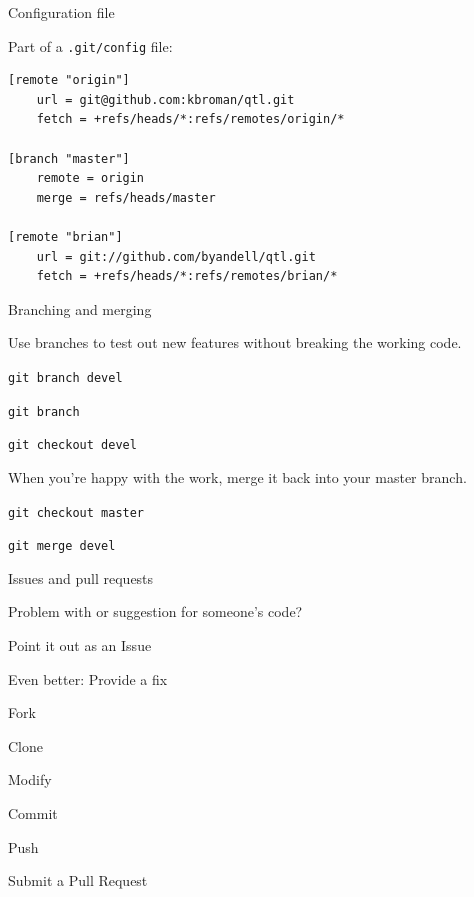\documentclass[12pt,t]{beamer}
\begin{document}
\begin{frame}[fragile]{Configuration file}

\vspace{24pt}

Part of a {\tt .git/config} file:

\begin{lstlisting}
[remote "origin"]
    url = git@github.com:kbroman/qtl.git
    fetch = +refs/heads/*:refs/remotes/origin/*

[branch "master"]
    remote = origin
    merge = refs/heads/master

[remote "brian"]
    url = git://github.com/byandell/qtl.git
    fetch = +refs/heads/*:refs/remotes/brian/*
\end{lstlisting}

\end{frame}


\begin{frame}{Branching and merging}

\bbi
\item Use branches to test out new features without breaking the
  working code.
\bi
\item[] {\tt git branch devel}
\item[] {\tt git branch}
\item[] {\tt git checkout devel}
\ei
\item When you're happy with the work, merge it back into your master
  branch.
\bi
\item[] {\tt git checkout master}
\item[] {\tt git merge devel}
\ei
\ei
{}
\end{frame}

\begin{frame}{Issues and pull requests}
\bbi
\item Problem with or suggestion for someone's code?
\bi
\item Point it out as an Issue
\ei
\item Even better: Provide a fix
\bi
\item Fork
\item Clone
\item Modify
\item Commit
\item Push
\item Submit a Pull Request
\ei
\ei

\end{frame}
\end{document}

